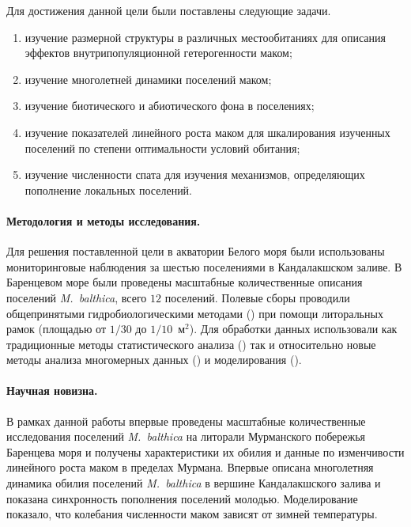 Для достижения данной цели были поставлены следующие задачи.
  \begin{enumerate}
    \item изучение размерной %
структуры в различных местообитаниях для описания эффектов внутрипопуляционной гетерогенности маком;
    \item изучение многолетней динамики поселений маком;
    \item изучение биотического и абиотического фона в поселениях;
    \item изучение показателей линейного роста маком для шкалирования изученных поселений по степени оптимальности условий обитания;
    \item изучение численности спата для изучения механизмов, определяющих пополнение локальных поселений.
  \end{enumerate}

\paragraph{Методология и методы исследования.}
Для решения поставленной цели в акватории Белого моря были использованы мониторинговые наблюдения за шестью поселениями в Кандалакшском заливе.
В Баренцевом море были проведены масштабные количественные описания поселений {\it M.~balthica}, всего $12$ поселений.
Полевые сборы проводили общепринятыми гидробиологическими методами (\cite{Eleftheriou_2013}) при помощи литоральных рамок (площадью от $1/30$ до $1/10$~м$^2$).
Для обработки данных использовали как традиционные методы статистического анализа (\cite{Tukey_1977, Mardia_et_al_1979, Chambers_Hastie_1991, Legendre_Legendre_2012, Hollander_et_al_2013}) так и относительно новые методы анализа многомерных данных (\cite{Clarke_et_al_2008}) и моделирования (\cite{Berryman_Turchin_2001}).

\paragraph{Научная новизна.}
В рамках данной работы впервые проведены масштабные количественные исследования поселений \textit{M.~balthica} на литорали Мурманского побережья Баренцева моря и получены характеристики их обилия и данные по изменчивости линейного роста маком в пределах Мурмана.
Впервые описана многолетняя динамика обилия поселений \textit{M.~balthica} в вершине Кандалакшского залива и показана синхронность пополнения поселений молодью.
Моделирование показало, что колебания численности маком зависят от зимней температуры.

